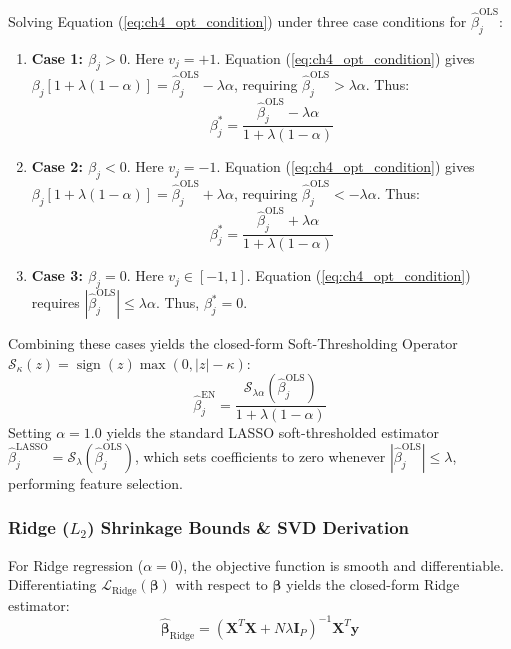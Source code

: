 Solving Equation (\ref{eq:ch4_opt_condition}) under three case conditions for $\hat{\beta}_j^{\text{OLS}}$:
\begin{enumerate}
    \item \textbf{Case 1: $\beta_j > 0$}. Here $v_j = +1$. Equation (\ref{eq:ch4_opt_condition}) gives $\beta_j [1 + \lambda(1-\alpha)] = \hat{\beta}_j^{\text{OLS}} - \lambda \alpha$, requiring $\hat{\beta}_j^{\text{OLS}} > \lambda \alpha$. Thus:
    $$\beta_j^* = \frac{\hat{\beta}_j^{\text{OLS}} - \lambda \alpha}{1 + \lambda(1-\alpha)}$$
    \item \textbf{Case 2: $\beta_j < 0$}. Here $v_j = -1$. Equation (\ref{eq:ch4_opt_condition}) gives $\beta_j [1 + \lambda(1-\alpha)] = \hat{\beta}_j^{\text{OLS}} + \lambda \alpha$, requiring $\hat{\beta}_j^{\text{OLS}} < -\lambda \alpha$. Thus:
    $$\beta_j^* = \frac{\hat{\beta}_j^{\text{OLS}} + \lambda \alpha}{1 + \lambda(1-\alpha)}$$
    \item \textbf{Case 3: $\beta_j = 0$}. Here $v_j \in [-1, 1]$. Equation (\ref{eq:ch4_opt_condition}) requires $|\hat{\beta}_j^{\text{OLS}}| \le \lambda \alpha$. Thus, $\beta_j^* = 0$.
\end{enumerate}

Combining these cases yields the closed-form Soft-Thresholding Operator $\mathcal{S}_{\kappa}(z) = \operatorname{sign}(z) \max(0, |z| - \kappa)$:
\begin{equation}
\hat{\beta}_j^{\text{EN}} = \frac{\mathcal{S}_{\lambda \alpha}\left( \hat{\beta}_j^{\text{OLS}} \right)}{1 + \lambda (1-\alpha)}
\label{eq:ch4_soft_thresholding_en}
\end{equation}
Setting $\alpha = 1.0$ yields the standard LASSO soft-thresholded estimator $\hat{\beta}_j^{\text{LASSO}} = \mathcal{S}_{\lambda}\left( \hat{\beta}_j^{\text{OLS}} \right)$, which sets coefficients to zero whenever $|\hat{\beta}_j^{\text{OLS}}| \le \lambda$, performing feature selection.

\subsubsection{Ridge ($L_2$) Shrinkage Bounds \& SVD Derivation}
For Ridge regression ($\alpha = 0$), the objective function is smooth and differentiable. Differentiating $\mathcal{L}_{\text{Ridge}}(\boldsymbol{\beta})$ with respect to $\boldsymbol{\beta}$ yields the closed-form Ridge estimator:
\begin{equation}
\hat{\boldsymbol{\beta}}_{\text{Ridge}} = \left( \mathbf{X}^T \mathbf{X} + N \lambda \mathbf{I}_P \right)^{-1} \mathbf{X}^T \mathbf{y}
\label{eq:ch4_ridge_closed_form}
\end{equation}

